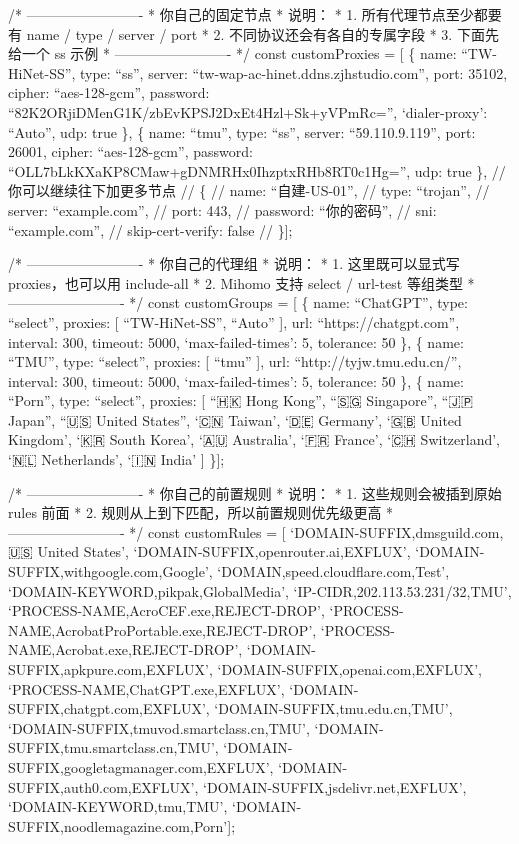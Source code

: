 \documentclass[
  chinese,
  9pt,
  a4paper,
]{ctexart}
\begin{document}
/* ------------------------- * 你自己的固定节点 * 说明： * 1.
所有代理节点至少都要有 name / type / server / port * 2.
不同协议还会有各自的专属字段 * 3. 下面先给一个 ss 示例 *
------------------------- */ const customProxies = {[} \{ name:
``TW-HiNet-SS'', type: ``ss'', server:
``tw-wap-ac-hinet.ddns.zjhstudio.com'', port: 35102, cipher:
``aes-128-gcm'', password:
``82K2ORjiDMenG1K/zbEvKPSJ2DxEt4Hzl+Sk+yVPmRc='', `dialer-proxy':
``Auto'', udp: true \}, \{ name: ``tmu'', type: ``ss'', server:
``59.110.9.119'', port: 26001, cipher: ``aes-128-gcm'', password:
``OLL7bLkKXaKP8CMaw+gDNMRHx0IhzptxRHb8RT0c1Hg='', udp: true \}, //
你可以继续往下加更多节点 // \{ // name: ``自建-US-01'', // type:
``trojan'', // server: ``example.com'', // port: 443, // password:
``你的密码'', // sni: ``example.com'', // skip-cert-verify: false //
\}{]};

/* ------------------------- * 你自己的代理组 * 说明： * 1.
这里既可以显式写 proxies，也可以用 include-all * 2. Mihomo 支持 select /
url-test 等组类型 * ------------------------- */ const customGroups =
{[} \{ name: ``ChatGPT'', type: ``select'', proxies: {[}
``TW-HiNet-SS'', ``Auto'' {]}, url: ``https://chatgpt.com'', interval:
300, timeout: 5000, `max-failed-times': 5, tolerance: 50 \}, \{ name:
``TMU'', type: ``select'', proxies: {[} ``tmu'' {]}, url:
``http://tyjw.tmu.edu.cn/'', interval: 300, timeout: 5000,
`max-failed-times': 5, tolerance: 50 \}, \{ name: ``Porn'', type:
``select'', proxies: {[} ``🇭🇰 Hong Kong'', ``🇸🇬 Singapore'', ``🇯🇵
Japan'', ``🇺🇸 United States'', `🇨🇳 Taiwan', `🇩🇪 Germany', `🇬🇧 United
Kingdom', `🇰🇷 South Korea', `🇦🇺 Australia', `🇫🇷 France', `🇨🇭
Switzerland', `🇳🇱 Netherlands', `🇮🇳 India' {]} \}{]};

/* ------------------------- * 你自己的前置规则 * 说明： * 1.
这些规则会被插到原始 rules 前面 * 2.
规则从上到下匹配，所以前置规则优先级更高 * ------------------------- */
const customRules = {[} `DOMAIN-SUFFIX,dmsguild.com,🇺🇸 United States',
`DOMAIN-SUFFIX,openrouter.ai,EXFLUX',
`DOMAIN-SUFFIX,withgoogle.com,Google',
`DOMAIN,speed.cloudflare.com,Test', `DOMAIN-KEYWORD,pikpak,GlobalMedia',
`IP-CIDR,202.113.53.231/32,TMU', `PROCESS-NAME,AcroCEF.exe,REJECT-DROP',
`PROCESS-NAME,AcrobatProPortable.exe,REJECT-DROP',
`PROCESS-NAME,Acrobat.exe,REJECT-DROP',
`DOMAIN-SUFFIX,apkpure.com,EXFLUX', `DOMAIN-SUFFIX,openai.com,EXFLUX',
`PROCESS-NAME,ChatGPT.exe,EXFLUX', `DOMAIN-SUFFIX,chatgpt.com,EXFLUX',
`DOMAIN-SUFFIX,tmu.edu.cn,TMU',
`DOMAIN-SUFFIX,tmuvod.smartclass.cn,TMU',
`DOMAIN-SUFFIX,tmu.smartclass.cn,TMU',
`DOMAIN-SUFFIX,googletagmanager.com,EXFLUX',
`DOMAIN-SUFFIX,auth0.com,EXFLUX', `DOMAIN-SUFFIX,jsdelivr.net,EXFLUX',
`DOMAIN-KEYWORD,tmu,TMU', `DOMAIN-SUFFIX,noodlemagazine.com,Porn'{]};
\end{document}
